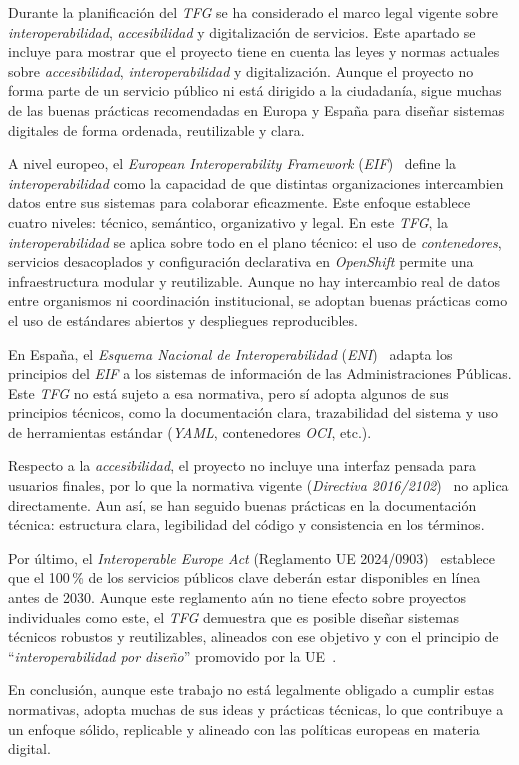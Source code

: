 Durante la planificación del \textit{TFG} se ha considerado el marco legal vigente sobre \textit{interoperabilidad}, \textit{accesibilidad} y digitalización de servicios. Este apartado se incluye para mostrar que el proyecto tiene en cuenta las leyes y normas actuales sobre \textit{accesibilidad}, \textit{interoperabilidad} y digitalización. Aunque el proyecto no forma parte de un servicio público ni está dirigido a la ciudadanía, sigue muchas de las buenas prácticas recomendadas en Europa y España para diseñar sistemas digitales de forma ordenada, reutilizable y clara.

A nivel europeo, el \textit{European Interoperability Framework} (\textit{EIF})~\cite{ref76} define la \textit{interoperabilidad} como la capacidad de que distintas organizaciones intercambien datos entre sus sistemas para colaborar eficazmente. Este enfoque establece cuatro niveles: técnico, semántico, organizativo y legal. En este \textit{TFG}, la \textit{interoperabilidad} se aplica sobre todo en el plano técnico: el uso de \textit{contenedores}, servicios desacoplados y configuración declarativa en \textit{OpenShift} permite una infraestructura modular y reutilizable. Aunque no hay intercambio real de datos entre organismos ni coordinación institucional, se adoptan buenas prácticas como el uso de estándares abiertos y despliegues reproducibles.

En España, el \textit{Esquema Nacional de Interoperabilidad} (\textit{ENI})~\cite{ref77} adapta los principios del \textit{EIF} a los sistemas de información de las Administraciones Públicas. Este \textit{TFG} no está sujeto a esa normativa, pero sí adopta algunos de sus principios técnicos, como la documentación clara, trazabilidad del sistema y uso de herramientas estándar (\textit{YAML}, contenedores \textit{OCI}, etc.).

Respecto a la \textit{accesibilidad}, el proyecto no incluye una interfaz pensada para usuarios finales, por lo que la normativa vigente (\textit{Directiva 2016/2102})~\cite{ref77} no aplica directamente. Aun así, se han seguido buenas prácticas en la documentación técnica: estructura clara, legibilidad del código y consistencia en los términos.

Por último, el \textit{Interoperable Europe Act} (Reglamento UE 2024/0903)~\cite{ref78} establece que el 100\,\% de los servicios públicos clave deberán estar disponibles en línea antes de 2030. Aunque este reglamento aún no tiene efecto sobre proyectos individuales como este, el \textit{TFG} demuestra que es posible diseñar sistemas técnicos robustos y reutilizables, alineados con ese objetivo y con el principio de ``\textit{interoperabilidad por diseño}'' promovido por la UE~\cite{ref49}.

En conclusión, aunque este trabajo no está legalmente obligado a cumplir estas normativas, adopta muchas de sus ideas y prácticas técnicas, lo que contribuye a un enfoque sólido, replicable y alineado con las políticas europeas en materia digital.



